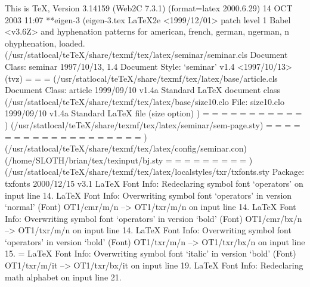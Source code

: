 This is TeX, Version 3.14159 (Web2C 7.3.1) (format=latex 2000.6.29)  14 OCT 2003 11:07
**eigen-3
(eigen-3.tex
LaTeX2e <1999/12/01> patch level 1
Babel <v3.6Z> and hyphenation patterns for american, french, german, ngerman, n
ohyphenation, loaded.
(/usr/statlocal/teTeX/share/texmf/tex/latex/seminar/seminar.cls
Document Class: seminar 1997/10/13, 1.4
Document Style: `seminar' v1.4 <1997/10/13> (tvz)
\slidewidth=
\slideheight=
\footheight=
(/usr/statlocal/teTeX/share/texmf/tex/latex/base/article.cls
Document Class: article 1999/09/10 v1.4a Standard LaTeX document class
(/usr/statlocal/teTeX/share/texmf/tex/latex/base/size10.clo
File: size10.clo 1999/09/10 v1.4a Standard LaTeX file (size option)
)
\c@part=
\c@section=
\c@subsection=
\c@subsubsection=
\c@paragraph=
\c@subparagraph=
\c@figure=
\c@table=
\abovecaptionskip=
\belowcaptionskip=
\bibindent=
)
(/usr/statlocal/teTeX/share/texmf/tex/latex/seminar/sem-page.sty)
\before@document=
\after@document=
\before@enddocument=
\c@slide=
\slide@count=
\@slidebox=
\not@slidebox=
\slide@hook=
\after@slide=
\slide@footins=
\slide@listdepth=
\saved@specials=
\before@newslide=
\after@slidepage=
\slidesep=
\slideframewidth=
\slideframesep=
\semin=
\semcm=
)
(/usr/statlocal/teTeX/share/texmf/tex/latex/config/seminar.con)
(/home/SLOTH/brian/tex/texinput/bj.sty
\c@nbct=
\c@assumption=
\c@defn=
\c@lemma=
\c@theorem=
\c@proposition=
\c@claim=
\c@corollary=
\c@@example=
)
(/usr/statlocal/teTeX/share/texmf/tex/latex/localstyles/txr/txfonts.sty
Package: txfonts 2000/12/15 v3.1
LaTeX Font Info:    Redeclaring symbol font `operators' on input line 14.
LaTeX Font Info:    Overwriting symbol font `operators' in version `normal'
(Font)                  OT1/cmr/m/n --> OT1/txr/m/n on input line 14.
LaTeX Font Info:    Overwriting symbol font `operators' in version `bold'
(Font)                  OT1/cmr/bx/n --> OT1/txr/m/n on input line 14.
LaTeX Font Info:    Overwriting symbol font `operators' in version `bold'
(Font)                  OT1/txr/m/n --> OT1/txr/bx/n on input line 15.
\symitalic=
LaTeX Font Info:    Overwriting symbol font `italic' in version `bold'
(Font)                  OT1/txr/m/it --> OT1/txr/bx/it on input line 19.
LaTeX Font Info:    Redeclaring math alphabet \mathrm on input line 21.
